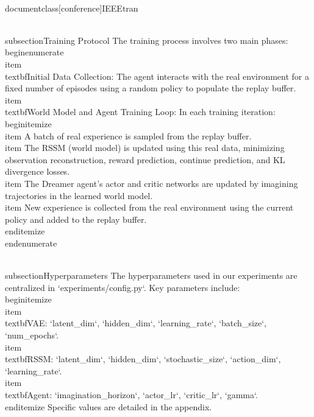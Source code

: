 \\documentclass[conference]{IEEEtran}
\begin{document}
\\subsection{Training Protocol}
The training process involves two main phases:
\\begin{enumerate}
    \\item \\textbf{Initial Data Collection}: The agent interacts with the real environment for a fixed number of episodes using a random policy to populate the replay buffer.
    \\item \\textbf{World Model and Agent Training Loop}: In each training iteration:
    \\begin{itemize}
        \\item A batch of real experience is sampled from the replay buffer.
        \\item The RSSM (world model) is updated using this real data, minimizing observation reconstruction, reward prediction, continue prediction, and KL divergence losses.
        \\item The Dreamer agent's actor and critic networks are updated by imagining trajectories in the learned world model.
        \\item New experience is collected from the real environment using the current policy and added to the replay buffer.
    \\end{itemize}
\\end{enumerate}

\\subsection{Hyperparameters}
The hyperparameters used in our experiments are centralized in `experiments/config.py`. Key parameters include:
\\begin{itemize}
    \\item \\textbf{VAE}: `latent_dim`, `hidden_dim`, `learning_rate`, `batch_size`, `num_epochs`.
    \\item \\textbf{RSSM}: `latent_dim`, `hidden_dim`, `stochastic_size`, `action_dim`, `learning_rate`.
    \\item \\textbf{Agent}: `imagination_horizon`, `actor_lr`, `critic_lr`, `gamma`.
\\end{itemize}
Specific values are detailed in the appendix.
\end{document}
